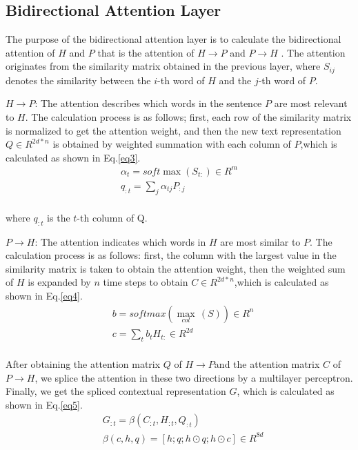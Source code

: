\documentclass[review]{elsarticle}
\begin{document}
\subsection{Bidirectional Attention Layer}
The purpose of the bidirectional attention layer is to calculate the bidirectional attention of $H$ and $P$ that is the attention of $H\to P$ and $P\to H$\cite{seo2016bidirectional} . The attention  originates from the similarity matrix  obtained in the previous layer, where ${{S}_{ij}}$ denotes the similarity between the $i$-th word of $H$ and the $j$-th word of $P$.

$H\to P$: The attention describes which words in the sentence $P$ are most relevant to $H$. The calculation process is as follows; first, each row of the similarity matrix is normalized to get the attention weight, and then the new text representation $Q\in {{R}^{2d*n}}$ is obtained by weighted summation with each column of $P$,which is calculated as shown in Eq.\ref{eq3}.
\begin{equation}\label{eq3}
\begin{array}{l}
	\alpha _t=soft\max \left( S_{t:} \right) \in R^m\\
	q_{:t}=\sum_j{\alpha _{tj}P_{:j}}\\
\end{array}
\end{equation}

where ${q_{:t}}$ is the $t$-th column of Q.

$P\to H$: The attention indicates which words in $H$ are most similar to $P$. The calculation process is as follows: first, the column with the largest value in the similarity matrix  is taken to obtain the attention weight, then the weighted sum of $H$ is expanded by $n$ time steps to obtain $C\in {{R}^{2d*n}}$,which is calculated as shown in Eq.\ref{eq4}.
\begin{equation}\label{eq4}
\begin{aligned}
    & b=softmax (\underset{col}{\mathop{\max }}\,(S))\in {{R}^{n}} \\ 
 & c=\sum\limits_{t}{{{b}_{t}}{{H}_{t:}}\in {{R}^{2d}}} \\ 
\end{aligned}
\end{equation}

After obtaining the attention matrix $Q$ of $H\to P$and the attention matrix $C$ of $P\to H$, we splice the attention in these two directions by a multilayer perceptron. Finally, we get the spliced contextual representation $G$, which is calculated as shown in Eq.\ref{eq5}.
\begin{equation}\label{eq5}
\begin{aligned}
    & {{G}_{:t}}=\beta ({{C}_{:t}},{{H}_{:t}},{{Q}_{:t}}) \\ 
 & \beta (c,h,q)=[h;q;h\odot q;h\odot c]\in {{R}^{8d}}  
\end{aligned}
\end{equation}
\end{document}
